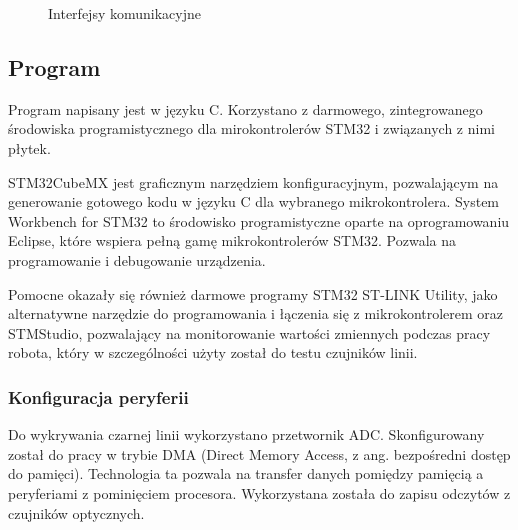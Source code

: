 \documentclass[12pt,a4paper]{article}
\begin{document}
\begin{figure}[tp]
    \hspace{0.4cm}
    \caption{Interfejsy komunikacyjne}
    \label{fig:komunikacja}
  \end{figure}%


\subsection{Program}
Program napisany jest w języku C. Korzystano z darmowego, zintegrowanego środowiska programistycznego dla mirokontrolerów STM32 i związanych z nimi płytek.

STM32CubeMX jest graficznym narzędziem konfiguracyjnym, pozwalającym na generowanie gotowego kodu w języku C dla wybranego mikrokontrolera. 
System Workbench for STM32 to środowisko programistyczne oparte na oprogramowaniu Eclipse, które wspiera pełną gamę mikrokontrolerów STM32. Pozwala na programowanie i debugowanie urządzenia.

Pomocne okazały się również darmowe programy STM32 ST-LINK Utility, jako alternatywne narzędzie do programowania i łączenia się z mikrokontrolerem oraz 
STMStudio, pozwalający na monitorowanie wartości zmiennych podczas pracy robota, który w szczególności użyty został do testu czujników linii.


\subsubsection{Konfiguracja peryferii}
Do wykrywania czarnej linii wykorzystano przetwornik ADC. Skonfigurowany został do pracy w trybie DMA (Direct Memory Access, z ang. bezpośredni dostęp do pamięci). Technologia ta pozwala na transfer danych pomiędzy pamięcią a peryferiami z pominięciem procesora. Wykorzystana została do zapisu odczytów z czujników optycznych. 
\end{document}
